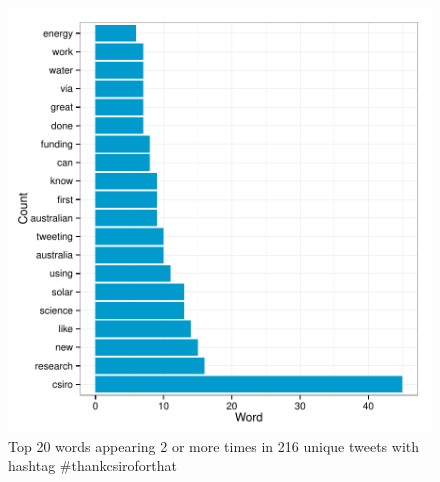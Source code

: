 \documentclass[a4paper,10pt]{article}
\begin{document}
\begin{figure}[h]
\begin{center}
\includegraphics[scale=0.55]{thankCSIROjson-bar.pdf}
\caption{Top 20 words appearing 2 or more times in 216 unique tweets with hashtag \#thankcsiroforthat}
\end{center}
\end{figure}

\newpage

%
%
\end{document}
